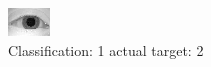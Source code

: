 \begin{figure}[h!]
\begin{center}
\includegraphics[width=0.60\columnwidth]{figures/ID884_class_1_target_2.png}
\end{center}
\caption{ Classification: 1 actual target: 2}
\label{fig:ID884_class_1_target_2}
\end{figure}
